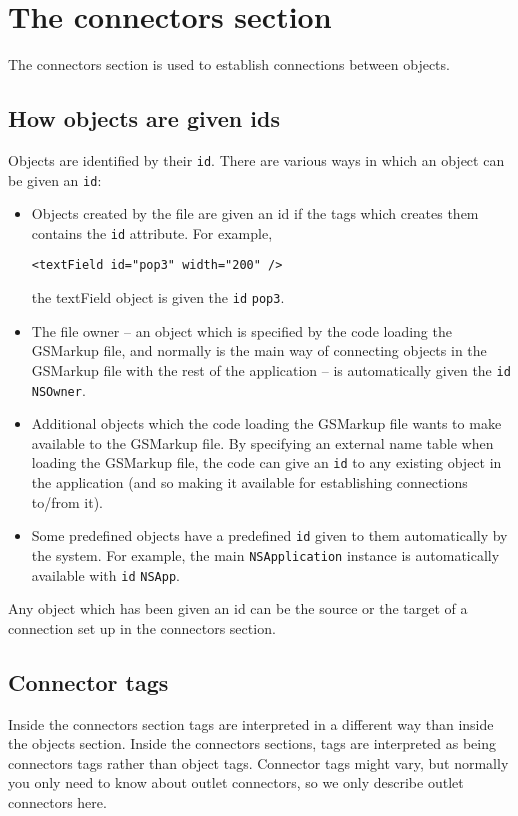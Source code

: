 \section{The connectors section}

The connectors section is used to establish connections between
objects.

\subsection{How objects are given ids}
Objects are identified by their \texttt{id}.  There are various ways
in which an object can be given an \texttt{id}:
\begin{itemize}
\item Objects created by the file are given an id if the tags which
  creates them contains the \texttt{id} attribute.  For example,
\begin{verbatim}
<textField id="pop3" width="200" />
\end{verbatim}
  the textField object is given the \texttt{id} \texttt{pop3}.
\item The file owner -- an object which is specified by the code
  loading the GSMarkup file, and normally is the main way of
  connecting objects in the GSMarkup file with the rest of the
  application -- is automatically given the \texttt{id}
  \texttt{NSOwner}.
\item Additional objects which the code loading the GSMarkup file
  wants to make available to the GSMarkup file.  By specifying an
  external name table when loading the GSMarkup file, the code can
  give an \texttt{id} to any existing object in the application (and
  so making it available for establishing connections to/from it).
\item Some predefined objects have a predefined \texttt{id} given to
  them automatically by the system.  For example, the main
  \texttt{NSApplication} instance is automatically available with
  \texttt{id} \texttt{NSApp}.
\end{itemize}
Any object which has been given an id can be the source or the target
of a connection set up in the connectors section.

\subsection{Connector tags}
Inside the connectors section tags are interpreted in a different way
than inside the objects section.  Inside the connectors sections, tags
are interpreted as being connectors tags rather than object tags.
Connector tags might vary, but normally you only need to know about
outlet connectors, so we only describe outlet connectors here.

